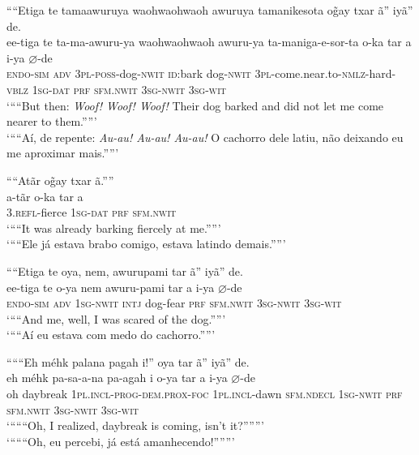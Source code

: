 \documentclass[output=paper,
modfonts,nonflat
]{langsci/langscibook}
\begin{document}
\largerpage[2] %
\ea ““Etiga te tamaawuruya waohwaohwaoh awuruya tamanikesota o\~{g}ay txar ã” iyã” de.\\[.3em]
\gll ee-tiga te ta-ma-awuru-ya waohwaohwaoh awuru-ya ta-maniga-e-sor-ta o-ka tar a i-ya \(\varnothing\)-de\\
\textsc{endo-sim} \textsc{adv} \textsc{3pl-poss}-dog-\textsc{nwit} \textsc{id}:bark dog-\textsc{nwit} \textsc{3pl}-come.near.to-\textsc{nmlz}-hard-\textsc{vblz} \textsc{1sg-dat} \textsc{prf} \textsc{sfm.nwit} \textsc{3sg-nwit} \textsc{3sg-wit}\\
\glt ‘““But then: \textit{Woof! Woof! Woof!} Their dog barked and did not let me come nearer to them.””’\\
\glt ‘““Aí, de repente: \textit{Au-au! Au-au! Au-au!} O cachorro dele latiu, não deixando eu me aproximar mais.””’\\
\z

\largerpage[2]
\ea ““Atãr o\~{g}ay txar ã.””\\[.3em]
\gll a-tãr o-ka tar a\\
\textsc{3.refl}-fierce \textsc{1sg-dat} \textsc{prf} \textsc{sfm.nwit}\\
\glt ‘““It was already barking fiercely at me.””’\\
\glt ‘““Ele já estava brabo comigo, estava latindo demais.””’\\
\z

\ea ““Etiga te oya, nem, awurupami tar ã” iyã” de.\\[.3em]
\gll ee-tiga te o-ya nem awuru-pami tar a i-ya \(\varnothing\)-de\\
\textsc{endo-sim} \textsc{adv} \textsc{1sg-nwit} \textsc{intj} dog-fear \textsc{prf} \textsc{sfm.nwit} \textsc{3sg-nwit} \textsc{3sg-wit}\\
\glt ‘““And me, well, I was scared of the dog.””’\\
\glt ‘““Aí eu estava com medo do cachorro.””’\\
\z

\ea “““Eh méhk palana pagah i!” oya tar ã” iyã” de.\\[.3em]
\gll eh méhk pa-sa-a-na pa-agah i o-ya tar a i-ya \(\varnothing\)-de\\
oh daybreak \textsc{1pl.incl-prog-dem.prox-foc} \textsc{1pl.incl}-dawn \textsc{sfm.ndecl} \textsc{1sg-nwit} \textsc{prf} \textsc{sfm.nwit} \textsc{3sg-nwit} \textsc{3sg-wit}\\
\glt ‘“““Oh, I realized, daybreak is coming, isn’t it?”””’\\
\glt ‘“““Oh, eu percebi, já está amanhecendo!”””’\\
\z
\end{document}
